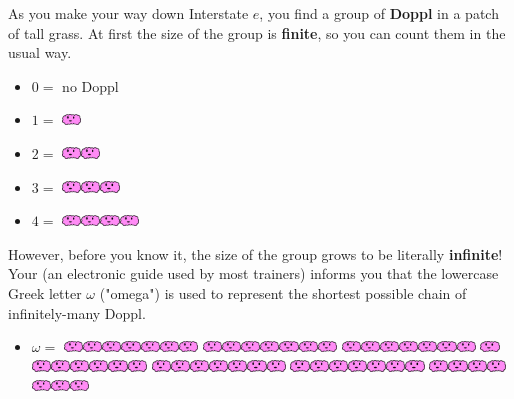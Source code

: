 

\newcommand{\mappDoppl}{\includegraphics[height=0.12in]{assets/doppl.pdf}}
\newcommand{\mappDopplOmega}{\includegraphics[height=0.12in]{assets/doppl-omega.pdf}}
\newcommand{\mappDopplOmegaSquared}{\includegraphics[height=0.12in]{assets/doppl-omega2.pdf}}

As you make your way down Interstate \(e\), you find a group of
\textbf{Doppl} \mappMobimon{} in a patch of tall grass.
At first the size of the group is \textbf{finite}, so you can count them
in the usual way.

\begin{itemize}
\item \(0=\) no Doppl

\item \(1=\) \mappDoppl

\item \(2=\) \mappDoppl\mappDoppl

\item \(3=\) \mappDoppl\mappDoppl\mappDoppl

\item \(4=\) \mappDoppl\mappDoppl\mappDoppl\mappDoppl
\end{itemize}

However, before you know it, the size of the group grows to
be literally \textbf{infinite}! Your \mappMobidex{} (an electronic
guide used by most trainers)
informs you that the lowercase Greek letter \(\omega\)
("omega") is used
to represent the shortest possible chain of infinitely-many Doppl.

\begin{itemize}
  \item \(\omega=\)
  \mappDoppl\mappDoppl\mappDoppl\mappDoppl\mappDoppl\mappDoppl\mappDoppl
  \mappDoppl\mappDoppl\mappDoppl\mappDoppl\mappDoppl\mappDoppl\mappDoppl
  \mappDoppl\mappDoppl\mappDoppl\mappDoppl\mappDoppl\mappDoppl\mappDoppl
  \mappDoppl\mappDoppl\mappDoppl\mappDoppl\mappDoppl\mappDoppl\mappDoppl
  \mappDoppl\mappDoppl\mappDoppl\mappDoppl\mappDoppl\mappDoppl\mappDoppl
  \mappDoppl\mappDoppl\mappDoppl\mappDoppl\mappDoppl\mappDoppl\mappDoppl
  \mappDoppl\mappDoppl\mappDoppl\mappDoppl\mappDoppl\mappDoppl\mappDoppl
\end{itemize}

